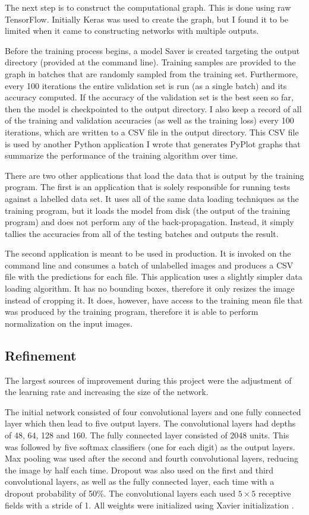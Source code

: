 \documentclass[12pt]{article}
\begin{document}
The next step is to construct the computational graph.
This is done using raw TensorFlow.
Initially Keras was used to create the graph, but I found it to be limited when it came to constructing networks with multiple outputs.

Before the training process begins, a model Saver is created targeting the output directory (provided at the command line).
Training samples are provided to the graph in batches that are randomly sampled from the training set.
Furthermore, every 100 iterations the entire validation set is run (as a single batch) and its accuracy computed.
If the accuracy of the validation set is the best seen so far, then the model is checkpointed to the output directory.
I also keep a record of all of the training and validation accuracies (as well as the training loss) every 100 iterations, which are written to a CSV file in the output directory.
This CSV file is used by another Python application I wrote that generates PyPlot graphs that summarize the performance of the training algorithm over time.

There are two other applications that load the data that is output by the training program.
The first is an application that is solely responsible for running tests against a labelled data set.
It uses all of the same data loading techniques as the training program, but it loads the model from disk (the output of the training program) and does not perform any of the back-propagation. 
Instead, it simply tallies the accuracies from all of the testing batches and outputs the result.

The second application is meant to be used in production.
It is invoked on the command line and consumes a batch of unlabelled images and produces a CSV file with the predictions for each file.
This application uses a slightly simpler data loading algorithm.
It has no bounding boxes, therefore it only resizes the image instead of cropping it. 
It does, however, have access to the training mean file that was produced by the training program, therefore it is able to perform normalization on the input images.

\subsection{Refinement}
The largest sources of improvement during this project were the adjustment of the learning rate and increasing the size of the network.

The initial network consisted of four convolutional layers and one fully connected layer which then lead to five output layers.
The convolutional layers had depths of 48, 64, 128 and 160.
The fully connected layer consisted of 2048 units.
This was followed by five softmax classifiers (one for each digit) as the output layers.
Max pooling was used after the second and fourth convolutional layers, reducing the image by half each time.
Dropout was also used on the first and third convolutional layers, as well as the fully connected layer, each time with a dropout probability of 50\%.
The convolutional layers each used $5 \times 5$ receptive fields with a stride of 1.
All weights were initialized using Xavier initialization \cite{xavier}.
\end{document}
